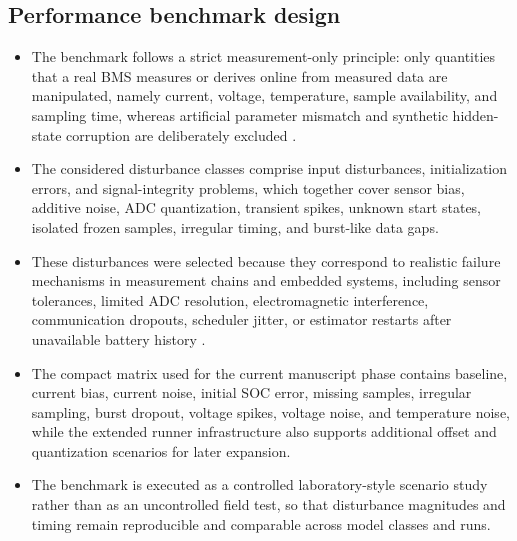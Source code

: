 \documentclass[review,nopreprintline]{elsarticle}
\begin{document}
\subsection{Performance benchmark design}
\begin{itemize}[leftmargin=*]
    \item The benchmark follows a strict measurement-only principle: only quantities that a real BMS measures or derives online from measured data are manipulated, namely current, voltage, temperature, sample availability, and sampling time, whereas artificial parameter mismatch and synthetic hidden-state corruption are deliberately excluded \cite{bergerBenchmarkingBatteryManagement2024}.
    \item The considered disturbance classes comprise input disturbances, initialization errors, and signal-integrity problems, which together cover sensor bias, additive noise, ADC quantization, transient spikes, unknown start states, isolated frozen samples, irregular timing, and burst-like data gaps.
    \item These disturbances were selected because they correspond to realistic failure mechanisms in measurement chains and embedded systems, including sensor tolerances, limited ADC resolution, electromagnetic interference, communication dropouts, scheduler jitter, or estimator restarts after unavailable battery history \cite{liRobustnessSOCEstimation2015,naseriReliableWirelessBMS2025,bergerBenchmarkingBatteryManagement2024}.
    \item The compact matrix used for the current manuscript phase contains baseline, current bias, current noise, initial SOC error, missing samples, irregular sampling, burst dropout, voltage spikes, voltage noise, and temperature noise, while the extended runner infrastructure also supports additional offset and quantization scenarios for later expansion.
    \item The benchmark is executed as a controlled laboratory-style scenario study rather than as an uncontrolled field test, so that disturbance magnitudes and timing remain reproducible and comparable across model classes and runs.
\end{itemize}
\end{document}
